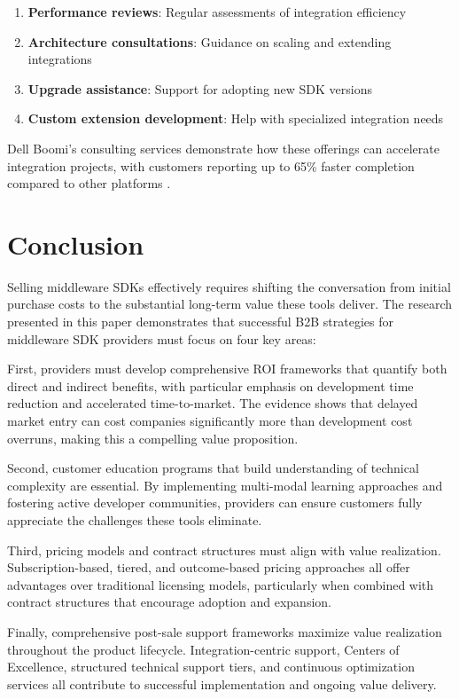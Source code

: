 \documentclass[11pt,a4paper]{article}
\begin{document}
\begin{enumerate}
    \item \textbf{Performance reviews}: Regular assessments of integration efficiency
    \item \textbf{Architecture consultations}: Guidance on scaling and extending integrations
    \item \textbf{Upgrade assistance}: Support for adopting new SDK versions
    \item \textbf{Custom extension development}: Help with specialized integration needs
\end{enumerate}

Dell Boomi's consulting services demonstrate how these offerings can accelerate integration projects, with customers reporting up to 65\% faster completion compared to other platforms \cite{multishoring2023}.

\section{Conclusion}

Selling middleware SDKs effectively requires shifting the conversation from initial purchase costs to the substantial long-term value these tools deliver. The research presented in this paper demonstrates that successful B2B strategies for middleware SDK providers must focus on four key areas:

First, providers must develop comprehensive ROI frameworks that quantify both direct and indirect benefits, with particular emphasis on development time reduction and accelerated time-to-market. The evidence shows that delayed market entry can cost companies significantly more than development cost overruns, making this a compelling value proposition.

Second, customer education programs that build understanding of technical complexity are essential. By implementing multi-modal learning approaches and fostering active developer communities, providers can ensure customers fully appreciate the challenges these tools eliminate.

Third, pricing models and contract structures must align with value realization. Subscription-based, tiered, and outcome-based pricing approaches all offer advantages over traditional licensing models, particularly when combined with contract structures that encourage adoption and expansion.

Finally, comprehensive post-sale support frameworks maximize value realization throughout the product lifecycle. Integration-centric support, Centers of Excellence, structured technical support tiers, and continuous optimization services all contribute to successful implementation and ongoing value delivery.
\end{document}
